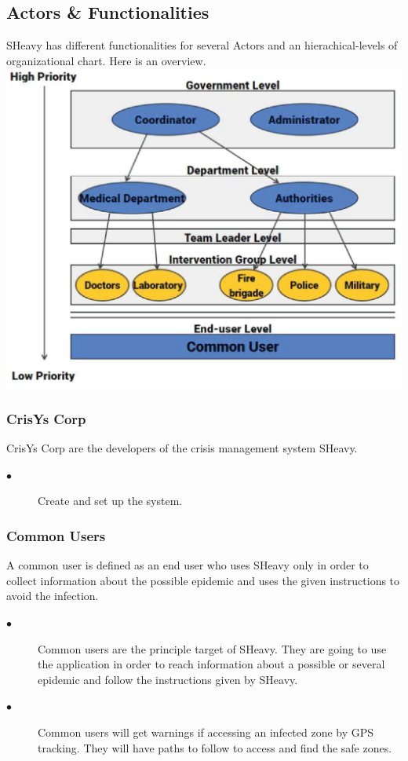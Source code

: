 \subsection{Actors \& Functionalities}
SHeavy has different functionalities for several Actors and  an
hierachical-levels of organizational chart. Here is an overview.\\

\includegraphics{images/ActorLevels.eps} \\

\subsubsection{CrisYs Corp}
CrisYs Corp are the developers of the crisis management system SHeavy.\\
\begin{description}
 \item[$\bullet$] Create and set up the system.
\end{description} 

\subsubsection{Common Users}
A common user is defined as an end user who uses SHeavy only in order to
collect information about the possible epidemic and uses the given instructions
to avoid the infection.\\
\begin{description}
 \item[$\bullet$] Common users are the principle target of SHeavy. They are
 going to use the application in order to reach information about a possible
 or several epidemic and follow the instructions given by SHeavy. 
 \item[$\bullet$]Common users will get warnings if accessing an infected
zone by GPS tracking. They will have paths to follow to access and find the
safe zones.
\end{description}

